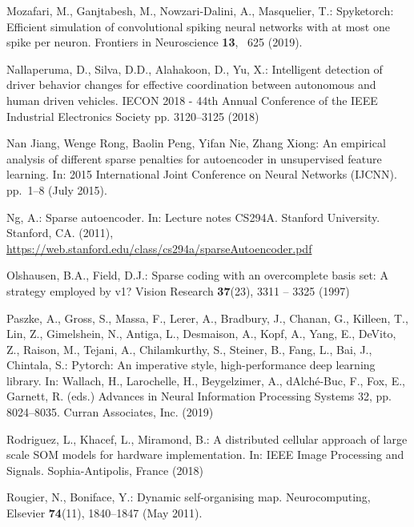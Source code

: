 \documentclass[runningheads]{llncs}
\begin{document}
\begin{thebibliography}{10}
Mozafari, M., Ganjtabesh, M., Nowzari-Dalini, A., Masquelier, T.: Spyketorch:
  Efficient simulation of convolutional spiking neural networks with at most
  one spike per neuron. Frontiers in Neuroscience  \textbf{13}, ~625 (2019).

Nallaperuma, D., Silva, D.D., Alahakoon, D., Yu, X.: Intelligent detection of
  driver behavior changes for effective coordination between autonomous and
  human driven vehicles. IECON 2018 - 44th Annual Conference of the IEEE
  Industrial Electronics Society pp. 3120--3125 (2018)

{Nan Jiang}, {Wenge Rong}, {Baolin Peng}, {Yifan Nie}, {Zhang Xiong}: An
  empirical analysis of different sparse penalties for autoencoder in
  unsupervised feature learning. In: 2015 International Joint Conference on
  Neural Networks (IJCNN). pp.~1--8 (July 2015).

Ng, A.: Sparse autoencoder. In: Lecture notes CS294A. Stanford University.
  Stanford, CA. (2011),
  \url{https://web.stanford.edu/class/cs294a/sparseAutoencoder.pdf}

Olshausen, B.A., Field, D.J.: Sparse coding with an overcomplete basis set: A
  strategy employed by v1? Vision Research  \textbf{37}(23),  3311 -- 3325
  (1997)

Paszke, A., Gross, S., Massa, F., Lerer, A., Bradbury, J., Chanan, G., Killeen,
  T., Lin, Z., Gimelshein, N., Antiga, L., Desmaison, A., Kopf, A., Yang, E.,
  DeVito, Z., Raison, M., Tejani, A., Chilamkurthy, S., Steiner, B., Fang, L.,
  Bai, J., Chintala, S.: Pytorch: An imperative style, high-performance deep
  learning library. In: Wallach, H., Larochelle, H., Beygelzimer, A.,
  d\textquotesingle Alch\'{e}-Buc, F., Fox, E., Garnett, R. (eds.) Advances in
  Neural Information Processing Systems 32, pp. 8024--8035. Curran Associates,
  Inc. (2019)

Rodriguez, L., Khacef, L., Miramond, B.: {A distributed cellular approach of
  large scale SOM models for hardware implementation}. In: {IEEE Image
  Processing and Signals}. Sophia-Antipolis, France (2018)

Rougier, N., Boniface, Y.: Dynamic self-organising map. Neurocomputing,
  Elsevier  \textbf{74}(11),  1840--1847 (May 2011).


\end{thebibliography}
\end{document}
